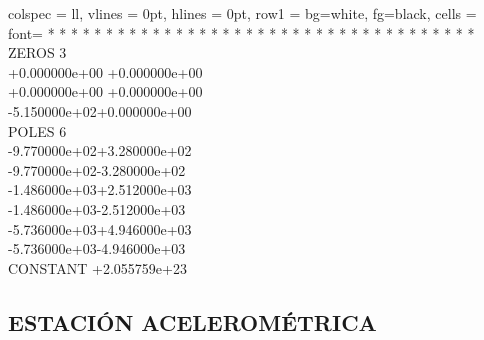 \begin{longtblr}{
		colspec = {ll},
		vlines  = 0pt,
		hlines  = 0pt,
		row{1}  = {bg=white, fg=black},
		cells = {font=\ttfamily}
	}
	 * * * * * * * * * * * * * * * * * * * * * * * * * * * * * * * * * * * * \\
	 ZEROS 3 \\
	 \hspace{1cm}+0.000000e+00 +0.000000e+00 \\
	 \hspace{1cm}+0.000000e+00 +0.000000e+00 \\
	 \hspace{1cm}-5.150000e+02+0.000000e+00 \\
	 POLES 6 \\
	 \hspace{1cm}-9.770000e+02+3.280000e+02 \\
	 \hspace{1cm}-9.770000e+02-3.280000e+02 \\
	 \hspace{1cm}-1.486000e+03+2.512000e+03 \\
	 \hspace{1cm}-1.486000e+03-2.512000e+03 \\
	 \hspace{1cm}-5.736000e+03+4.946000e+03 \\
	 \hspace{1cm}-5.736000e+03-4.946000e+03 \\
	 CONSTANT +2.055759e+23 \\
\end{longtblr}


\subsection{ESTACIÓN ACELEROMÉTRICA \MakeUppercase{}}
